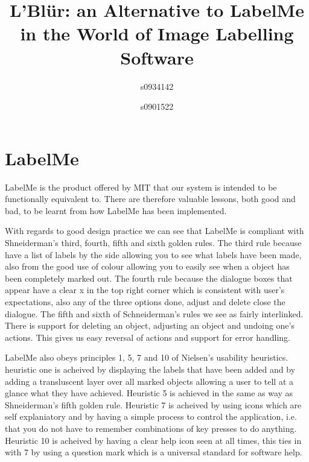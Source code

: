 \documentclass[a4paper,11pt,oneside]{article}
\begin{document}
\title{L'Bl\"{u}r: an Alternative to LabelMe in the World of Image Labelling Software}
\author{s0934142 \and s0901522}
\maketitle

\tableofcontents

\section{LabelMe}
LabelMe is the product offered by MIT that our system is intended to be
functionally equivalent to.  There are therefore valuable lessons, both good and
bad, to be learnt from how LabelMe has been implemented.

With regards to good design practice we can see that LabelMe is compliant with
Shneiderman's third, fourth, fifth and sixth golden rules.  The third rule
because have a list of labels by the side allowing you to see what labels have
been made, also from the good use of colour allowing you to easily see when a
object has been completely marked out.  The fourth rule because the dialogue
boxes that appear have a clear x in the top right corner which is consistent
with user's expectations, also any of the three options done, adjust and delete
close the dialogue.  The fifth and sixth of Schneiderman's rules we see as
fairly interlinked.  There is support for deleting an object, adjusting an
object and undoing one's actions.  This gives us easy reversal of actions and
support for error handling.

LabelMe also obeys principles 1, 5, 7 and 10 of Nielsen's usability heuristics. 
heuristic one is acheived by displaying the labels that have been added and by
adding a transluscent layer over all marked objects allowing a user to tell at a
glance what they have achieved.  Heuristic 5 is achieved in the same as way as
Shneiderman's fifth golden rule.  Heuristic 7 is acheived by using icons which
are self explaniatory and by having a simple process to control the application,
 i.e. that you do not have to remember combinations of key presses to do
anything. Heuristic 10 is acheived by having a clear help icon seen at all
times, this ties in with 7 by using a question mark which is a universal
standard for software help.
\end{document}
